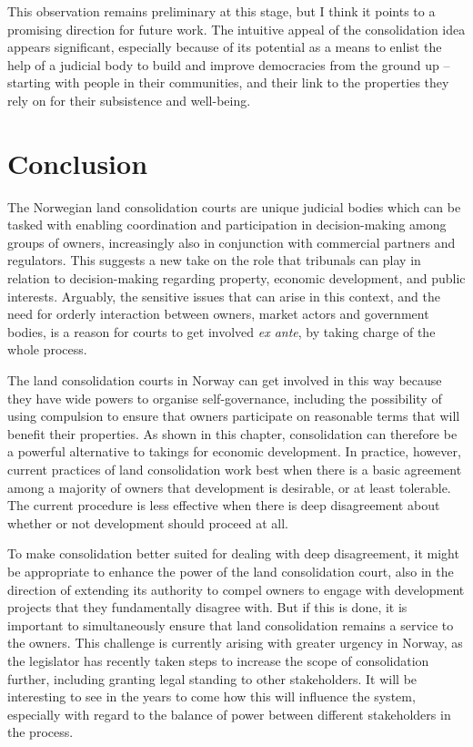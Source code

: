 This observation remains preliminary at this stage, but I think it points to a promising direction for future work. The intuitive appeal of the consolidation idea appears significant, especially because of its potential as a means to enlist the help of a judicial body to build and improve democracies from the ground up -- starting with people in their communities, and their link to the properties they rely on for their subsistence and well-being.

\section{Conclusion}\label{sec:6:6}

The Norwegian land consolidation courts are unique judicial bodies which can be tasked with enabling coordination and participation in decision-making among groups of owners, increasingly also in conjunction with commercial partners and regulators. This suggests a new take on the role that tribunals can play in relation to decision-making regarding property, economic development, and public interests. Arguably, the sensitive issues that can arise in this context, and the need for orderly interaction between owners, market actors and government bodies, is a reason for courts to get involved {\it ex ante}, by taking charge of the whole process.

The land consolidation courts in Norway can get involved in this way because they have wide powers to organise self-governance, including the possibility of using compulsion to ensure that owners participate on reasonable terms that will benefit their properties. As shown in this chapter, consolidation can therefore be a powerful alternative to takings for economic development. In practice, however, current practices of land consolidation work best when there is a basic agreement among a majority of owners that development is desirable, or at least tolerable. The current procedure is less effective when there is deep disagreement about whether or not development should proceed at all.

To make consolidation better suited for dealing with deep disagreement, it might be appropriate to enhance the power of the land consolidation court, also in the direction of extending its authority to compel owners to engage with development projects that they fundamentally disagree with. But if this is done, it is important to simultaneously ensure that land consolidation remains a service to the owners. This challenge is currently arising with greater urgency in Norway, as the legislator has recently taken steps to increase the scope of consolidation further, including granting legal standing to other stakeholders. It will be interesting to see in the years to come how this will influence the system, especially with regard to the balance of power between different stakeholders in the process.

